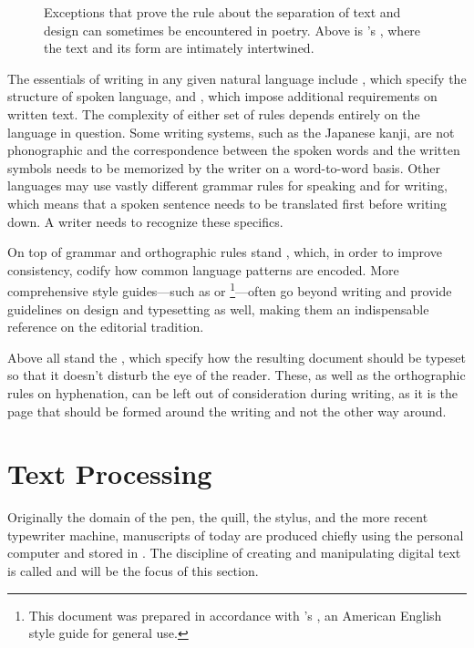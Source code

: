 \documentclass[
  a5paper,10pt,           %
  dvipsnames              %
]{book}
\begin{document}
\begin{figure}
  
  \caption{Exceptions that prove the rule about the separation of text and
    design can sometimes be encountered in poetry. Above is 's , where the text and its
    form are intimately intertwined.}
\end{figure}

The essentials of writing in any given natural language include , which specify the structure of spoken
language, and , which
impose additional requirements on written text. The complexity of either set of
rules depends entirely on the language in question. Some writing systems, such
as the Japanese kanji, are not phonographic and the correspondence between
the spoken words and the written symbols needs to be memorized by the writer on
a word-to-word basis. Other languages may use vastly different grammar rules for
speaking and for writing, which means that a spoken sentence needs to be
translated first before writing down. A writer needs to recognize these
specifics.

On top of grammar and orthographic rules stand , which, in
order to improve consistency, codify how common language patterns are encoded.
More comprehensive style guides---such as  or
\footnote{
  This document was prepared in accordance with 's
  , an American English style guide for general use. 
}---often go beyond writing and provide guidelines on design and typesetting as
well, making them an indispensable reference on the editorial tradition.

Above all stand the ,
which specify how the resulting document should be typeset so that it doesn't
disturb the eye of the reader. These, as well as the orthographic rules on
hyphenation, can be left out of consideration during writing, as it is the page
that should be formed around the writing and not the other way around.

\section{Text Processing}
Originally the domain of the pen, the quill, the stylus, and the more recent
typewriter machine, manuscripts of today are produced chiefly using the personal
computer and stored in . The discipline of creating and
manipulating digital text is called  and will be the focus
of this section.
\end{document}
